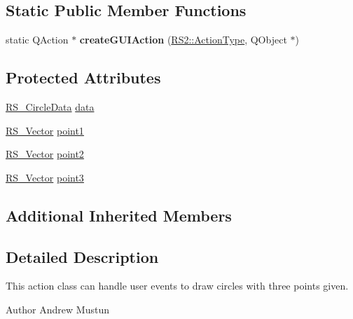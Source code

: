 \subsection*{Static Public Member Functions}
\begin{DoxyCompactItemize}
\item 
\hypertarget{classRS__ActionDrawCircle3P_a986f52a599eddd0f80a80dd22094e33a}{static Q\-Action $\ast$ {\bfseries create\-G\-U\-I\-Action} (\hyperlink{classRS2_afe3523e0bc41fd637b892321cfc4b9d7}{R\-S2\-::\-Action\-Type}, Q\-Object $\ast$)}\label{classRS__ActionDrawCircle3P_a986f52a599eddd0f80a80dd22094e33a}

\end{DoxyCompactItemize}
\subsection*{Protected Attributes}
\begin{DoxyCompactItemize}
\item 
\hyperlink{classRS__CircleData}{R\-S\-\_\-\-Circle\-Data} \hyperlink{classRS__ActionDrawCircle3P_a185bddf75b4906b8c1ef334de16b67d3}{data}
\item 
\hyperlink{classRS__Vector}{R\-S\-\_\-\-Vector} \hyperlink{classRS__ActionDrawCircle3P_a9d6af79c4de0259d07c4ca1160bddc45}{point1}
\item 
\hyperlink{classRS__Vector}{R\-S\-\_\-\-Vector} \hyperlink{classRS__ActionDrawCircle3P_adcba0ba478436eafc1ddb5feb5a2eda1}{point2}
\item 
\hyperlink{classRS__Vector}{R\-S\-\_\-\-Vector} \hyperlink{classRS__ActionDrawCircle3P_ab98aed3b878171e66a3e9e27452910c6}{point3}
\end{DoxyCompactItemize}
\subsection*{Additional Inherited Members}


\subsection{Detailed Description}
This action class can handle user events to draw circles with three points given.

\begin{DoxyAuthor}{Author}
Andrew Mustun 
\end{DoxyAuthor}


